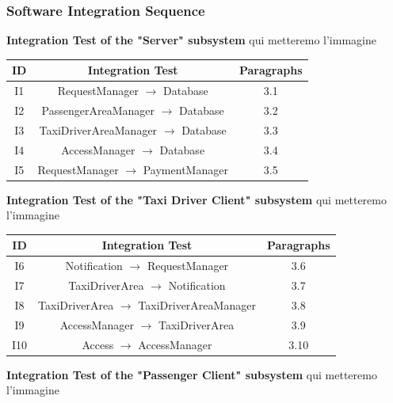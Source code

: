 \documentclass[18pt,oneside,a4paper, titlepage]{article}
\begin{document}
		\subsubsection{Software	Integration	Sequence}
			\textbf{Integration Test of the "Server" subsystem }
			qui metteremo l'immagine
			\begin{center}
				\centering
				\begin{tabular}{|c| c| c|}
					\hline \textbf{ID} & \textbf{Integration Test} & \textbf{Paragraphs} \\
					\hline		I1 & RequestManager $\rightarrow$ Database & 3.1\\
					\hline		I2 & PassengerAreaManager $\rightarrow$ Database & 3.2 \\
					\hline		I3 & TaxiDriverAreaManager $\rightarrow$ Database & 3.3\\
					\hline		I4 & AccessManager $\rightarrow$ Database & 3.4 \\
					\hline		I5 & RequestManager $\rightarrow$ PaymentManager & 3.5 \\
					\hline
				\end{tabular}
			\end{center}
			\textbf{Integration Test of the "Taxi Driver Client" subsystem }
			qui metteremo l'immagine
			\begin{center}
				\centering
				\begin{tabular}{|c| c| c|}
					\hline \textbf{ID} & \textbf{Integration Test} & \textbf{Paragraphs} \\
					\hline		I6 & Notification $\rightarrow$ RequestManager & 3.6\\
					\hline		I7 & TaxiDriverArea $\rightarrow$ Notification & 3.7 \\
					\hline		I8 & TaxiDriverArea $\rightarrow$ TaxiDriverAreaManager & 3.8\\
					\hline		I9 & AccessManager $\rightarrow$ TaxiDriverArea & 3.9 \\
					\hline		I10 & Access $\rightarrow$ AccessManager & 3.10 \\
					\hline
				\end{tabular}
			\end{center}
			\textbf{Integration Test of the "Passenger Client" subsystem}
			qui metteremo l'immagine
\end{document}

